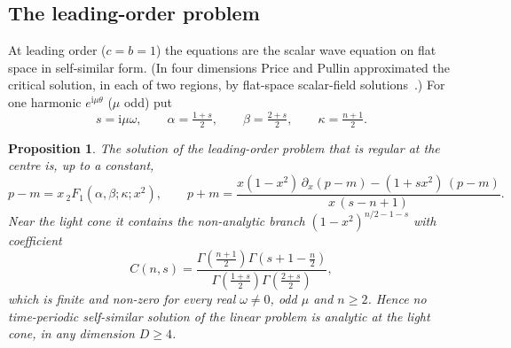 \documentclass{amsart}
\numberwithin{equation}{section}
\theoremstyle{plain}
\newtheorem{proposition}{Proposition}
\theoremstyle{definition}
\theoremstyle{remark}
\newcommand{\iu}{\mathrm{i}}
\begin{document}
\subsection{The leading-order problem}
At leading order ($c = b = 1$) the equations are the scalar wave equation on flat space in self-similar form. (In four
dimensions Price and Pullin approximated the critical solution, in each of two regions, by flat-space scalar-field
solutions~\cite{PricePullin1996}.) For one
harmonic $e^{\iu\mu\theta}$ ($\mu$ odd) put
\begin{equation}\label{eq:abk}
s = \iu\mu\omega,\qquad \alpha = \tfrac{1+s}{2},\qquad \beta = \tfrac{2+s}{2},\qquad \kappa = \tfrac{n+1}{2}.
\end{equation}

\begin{proposition}\label{prop:2}
The solution of the leading-order problem that is regular at the centre is, up to a constant,
\begin{equation}\label{eq:prop2sol}
p - m = x\,{}_2F_1(\alpha,\beta;\kappa;x^2), \qquad
p + m = \frac{x(1-x^2)\,\partial_x(p-m) - (1+sx^2)\,(p-m)}{x\,(s-n+1)} .
\end{equation}
Near the light cone it contains the non-analytic branch $(1-x^2)^{n/2-1-s}$ with coefficient
\begin{equation}\label{eq:C}
C(n,s) = \frac{\Gamma\!\left(\frac{n+1}{2}\right)\Gamma\!\left(s+1-\frac n2\right)}{\Gamma\!\left(\frac{1+s}{2}\right)\Gamma\!\left(\frac{2+s}{2}\right)},
\end{equation}
which is finite and non-zero for every real $\omega \ne 0$, odd $\mu$ and $n \ge 2$. Hence no time-periodic self-similar
solution of the linear problem is analytic at the light cone, in any dimension $D \ge 4$.
\end{proposition}
\end{document}
